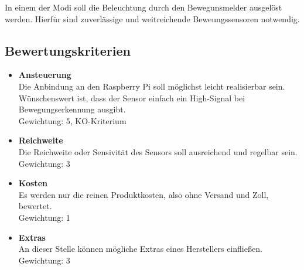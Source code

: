 In einem der Modi soll die Beleuchtung durch den Bewegunsmelder ausgelöst werden. Hierfür sind zuverlässige und weitreichende Beweungssensoren notwendig.
\subsection{Bewertungskriterien}
\begin{itemize}
\item \textbf{Ansteuerung}\\
Die Anbindung an den Raspberry Pi soll möglichst leicht realisierbar sein. Wünschenswert ist, dass der Sensor einfach ein High-Signal bei Bewegungserkennung ausgibt. \\
Gewichtung: 5, KO-Kriterium
\item \textbf{Reichweite}\\
Die Reichweite oder Sensivität des Sensors soll ausreichend und regelbar sein.\\
Gewichtung: 3
\item \textbf{Kosten}\\
Es werden nur die reinen Produktkosten, also ohne Versand und Zoll, bewertet. \\
Gewichtung: 1
\item \textbf{Extras}\\
An dieser Stelle können mögliche Extras eines Herstellers einfließen.\\
Gewichtung: 3
\end{itemize}

